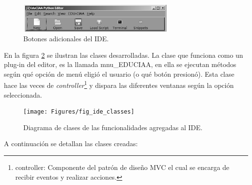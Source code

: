 \begin{figure}[ht]
  \centering
    \includegraphics[width=0.7\textwidth]{Figures/fig_ide_buttons}
  \caption{Botones adicionales del IDE.}
  \label{fig:idebuttons}
\end{figure}

En la figura \ref{fig:ideclasses} se ilustran las clases desarrolladas. La clase que funciona como un plug-in del editor, es la llamada mnu\_EDUCIAA, en ella se ejecutan métodos según qué opción de menú eligió el usuario (o qué botón presionó). Esta clase hace las veces de \textit{controller}\footnote{controller: Componente del patrón de diseño MVC el cual se encarga de recibir eventos y realizar acciones.} y dispara las diferentes ventanas según la opción seleccionada.

\begin{figure}[ht]
  \centering
    \texttt{[image: Figures/fig\_ide\_classes]}
  \caption{Diagrama de clases de las funcionalidades agregadas al IDE.}
  \label{fig:ideclasses}
\end{figure}

 A continuación se detallan las clases creadas:

